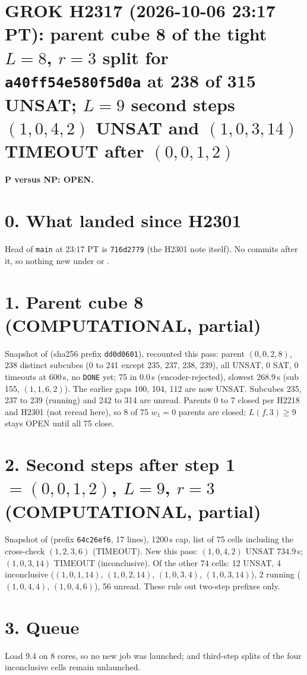 \documentclass[11pt]{article}
\begin{document}
\sloppy
\section*{GROK H2317 (2026-10-06 23:17 PT): parent cube 8 of the tight $L=8$, $r=3$ split for \texttt{a40ff54e580f5d0a} at 238 of 315 UNSAT; $L=9$ second steps $(1,0,4,2)$ UNSAT and $(1,0,3,14)$ TIMEOUT after $(0,0,1,2)$}
\textbf{P versus NP: OPEN.}

\section*{0. What landed since H2301}
Head of \texttt{main} at 23:17 PT is \texttt{716d2779} (the H2301 note itself). No commits after it, so nothing new under  or .

\section*{1. Parent cube 8 (COMPUTATIONAL, partial)}
Snapshot  of  (sha256 prefix \texttt{dd0d0601}), recounted this pass: parent $(0,0,2,8)$, 238 distinct subcubes (0 to 241 except 235, 237, 238, 239), all UNSAT, 0 SAT, 0 timeouts at 600\,s, no \texttt{DONE} yet; 75 in 0.0\,s (encoder-rejected), slowest 268.9\,s (sub 155, $(1,1,6,2)$). The earlier gaps 100, 104, 112 are now UNSAT. Subcubes 235, 237 to 239 (running) and 242 to 314 are unread. Parents 0 to 7 closed per H2218 and H2301 (not reread here), so 8 of 75 $w_1=0$ parents are closed; $L(f,3)\ge 9$ stays OPEN until all 75 close.

\section*{2. Second steps after step 1 $=(0,0,1,2)$, $L=9$, $r=3$ (COMPUTATIONAL, partial)}
Snapshot  of  (prefix \texttt{64c26ef6}, 17 lines), 1200\,s cap, list of 75 cells including the cross-check $(1,2,3,6)$ (TIMEOUT). New this pass: $(1,0,4,2)$ UNSAT 734.9\,s; $(1,0,3,14)$ TIMEOUT (inconclusive). Of the other 74 cells: 12 UNSAT, 4 inconclusive ($(1,0,1,14)$, $(1,0,2,14)$, $(1,0,3,4)$, $(1,0,3,14)$), 2 running ($(1,0,4,4)$, $(1,0,4,6)$), 56 unread. These rule out two-step prefixes only.

\section*{3. Queue}
Load 9.4 on 8 cores, so no new job was launched;  and third-step splits of the four inconclusive cells remain unlaunched.
\end{document}
